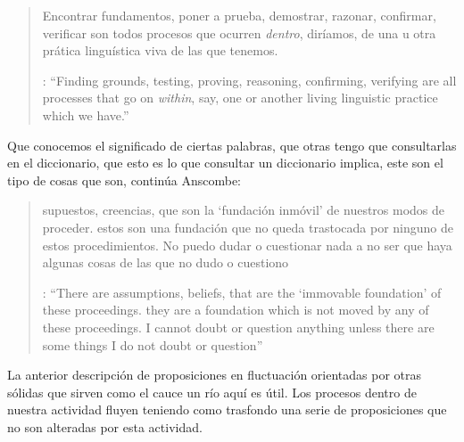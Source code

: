 \blockquote[{\cite[130]{anscombe1981parmenides:qli}}: \enquote{Finding grounds, testing, proving, reasoning, confirming, verifying are all processes that go on \emph{within}, say, one or another living linguistic practice which we have.}]{Encontrar fundamentos, poner a prueba, demostrar, razonar, confirmar, verificar son todos procesos que ocurren \emph{dentro}, diríamos, de una u otra prática linguística viva de las que tenemos.} Que conocemos el significado de ciertas palabras, que otras tengo que consultarlas en el diccionario, que esto es lo que consultar un diccionario implica, este son el tipo de cosas que son, continúa Anscombe: \blockquote[{\cite[130]{anscombe1981parmenides:qli}}: \enquote{There are assumptions, beliefs, that are the `immovable foundation' of these proceedings. \textelp{} they are a foundation which is not moved by any of these proceedings. I cannot doubt or question anything unless there are some things I do not doubt or question}]{supuestos, creencias, que son la `fundación inmóvil' de nuestros modos de proceder. \textelp{} estos son una fundación que no queda trastocada por ninguno de estos procedimientos. No puedo dudar o cuestionar nada a no ser que haya algunas cosas de las que no dudo o cuestiono}. La anterior descripción de proposiciones en fluctuación orientadas por otras sólidas que sirven como el cauce un río aquí es útil. Los procesos dentro de nuestra actividad fluyen teniendo como trasfondo una serie de proposiciones que no son alteradas por esta actividad.

